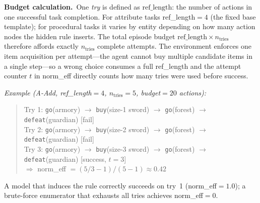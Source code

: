 \documentclass[11pt]{article}
\begin{document}
\begin{table}[h]
\centering
{}
\caption{Per-task $n_\text{tries}$ values and the corresponding brute-force enumeration strategy.}
\end{table}

\noindent\textbf{Budget calculation.}~One \emph{try} is defined as $\text{ref\_length}$: the number of actions in one successful task completion.
For attribute tasks ref\_length$=4$ (the fixed base template); for procedural tasks it varies by entity depending on how many action nodes the hidden rule inserts.
The total episode budget $\text{ref\_length} \times n_\text{tries}$ therefore affords exactly $n_\text{tries}$ complete attempts.
The environment enforces one item acquisition per attempt---the agent cannot buy multiple candidate items in a single step---so a wrong choice consumes a full ref\_length and the attempt counter $t$ in norm\_eff directly counts how many tries were used before success.

\noindent\textit{Example (A-Add, ref\_length$=4$, $n_\text{tries}{=}5$, budget$=20$ actions):}
\begin{quote}\small
Try 1: \texttt{go}(armory) $\to$ \texttt{buy}(size-1 sword) $\to$ \texttt{go}(forest) $\to$ \texttt{defeat}(guardian) \hfill [fail]\\
Try 2: \texttt{go}(armory) $\to$ \texttt{buy}(size-2 sword) $\to$ \texttt{go}(forest) $\to$ \texttt{defeat}(guardian) \hfill [fail]\\
Try 3: \texttt{go}(armory) $\to$ \texttt{buy}(size-3 sword) $\to$ \texttt{go}(forest) $\to$ \texttt{defeat}(guardian) \hfill [success, $t{=}3$]\\
$\Rightarrow$ norm\_eff $= (5/3-1)/(5-1) \approx 0.42$
\end{quote}
A model that induces the rule correctly succeeds on try~1 (norm\_eff$=1.0$); a brute-force enumerator that exhausts all tries achieves norm\_eff$=0$.
\end{document}
